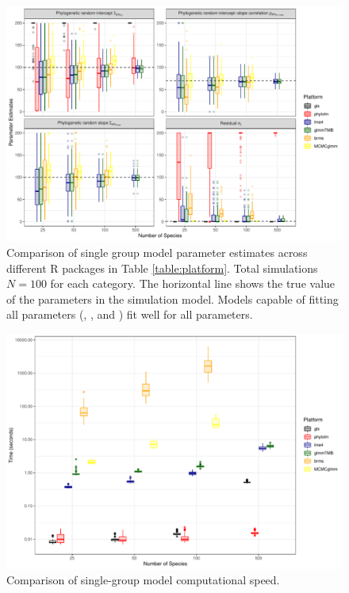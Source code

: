 \documentclass[12pt]{article}
\begin{document}
\begin{center}
\begin{figure}[H]
  \includegraphics[scale=0.7]{./figure/ssplot.pdf}
  \caption{Comparison of single group model parameter estimates across different R packages in Table \ref{table:platform}. Total simulations $N=100$ for each category. The horizontal line shows the true value of the parameters in the simulation model. Models capable of fitting all parameters (,  , and ) fit well for all parameters.
}
\label{ssplot}
\end{figure}
\end{center}
\begin{center}
\begin{figure}[H]
  \includegraphics[scale=0.7]{./figure/sstime.pdf}
  \caption{Comparison of single-group model computational speed.}
\label{ssplot_speed}
\end{figure}
\end{center}
\end{document}
